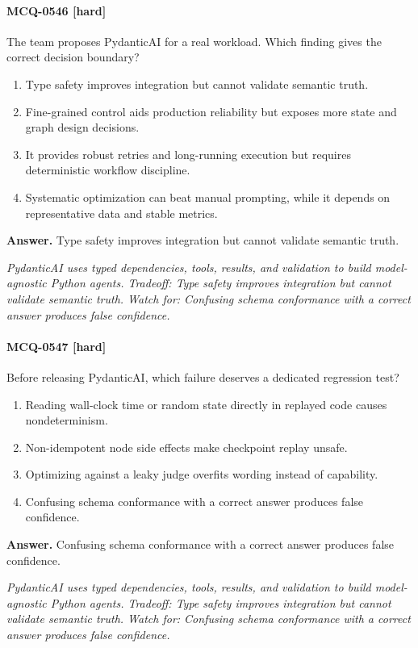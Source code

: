 \paragraph{MCQ-0546 [hard]} The team proposes PydanticAI for a real workload. Which finding gives the correct decision boundary?
\begin{enumerate}[label=\Alph*.]
\item Type safety improves integration but cannot validate semantic truth.
\item Fine-grained control aids production reliability but exposes more state and graph design decisions.
\item It provides robust retries and long-running execution but requires deterministic workflow discipline.
\item Systematic optimization can beat manual prompting, while it depends on representative data and stable metrics.
\end{enumerate}
\noindent\textbf{Answer.} Type safety improves integration but cannot validate semantic truth.
\par\textit{PydanticAI uses typed dependencies, tools, results, and validation to build model-agnostic Python agents. Tradeoff: Type safety improves integration but cannot validate semantic truth. Watch for: Confusing schema conformance with a correct answer produces false confidence.}
\paragraph{MCQ-0547 [hard]} Before releasing PydanticAI, which failure deserves a dedicated regression test?
\begin{enumerate}[label=\Alph*.]
\item Reading wall-clock time or random state directly in replayed code causes nondeterminism.
\item Non-idempotent node side effects make checkpoint replay unsafe.
\item Optimizing against a leaky judge overfits wording instead of capability.
\item Confusing schema conformance with a correct answer produces false confidence.
\end{enumerate}
\noindent\textbf{Answer.} Confusing schema conformance with a correct answer produces false confidence.
\par\textit{PydanticAI uses typed dependencies, tools, results, and validation to build model-agnostic Python agents. Tradeoff: Type safety improves integration but cannot validate semantic truth. Watch for: Confusing schema conformance with a correct answer produces false confidence.}
